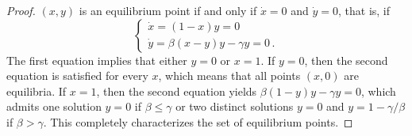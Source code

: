 \documentclass{article}
\begin{document}
\begin{proof}
    $(x, y)$ is an equilibrium point if and only if $\dot{x} = 0$ and $\dot{y} = 0$, that is, if
    \begin{equation*}
        \begin{cases}
            \dot{x} = (1 - x)y = 0 \\
            \dot{y} = \beta(x - y)y - \gamma y = 0\,.
        \end{cases}
    \end{equation*}  
    The first equation implies that either $y = 0$ or $x = 1$. If $y = 0$, then the second equation is satisfied for every $x$, which means that all points $(x,0)$ are equilibria. If $x = 1$, then the second equation yields $\beta(1 - y)y - \gamma y = 0$, which admits one solution $y = 0$ if $\beta \le \gamma$ or two distinct solutions $y = 0$ and $y = 1 - \gamma/\beta$ if $\beta > \gamma$. This completely characterizes the set of equilibrium points.


\end{proof}
\end{document}
